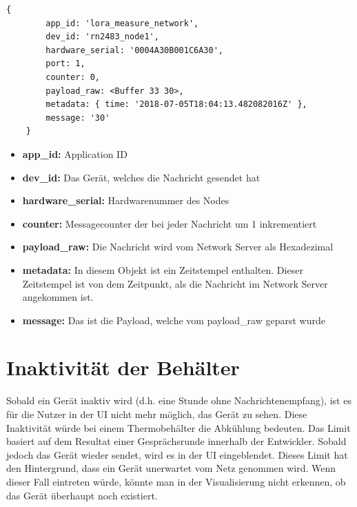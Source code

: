 \begin{lstlisting}[caption=Payload,label=lst:payload]
    { 
        app_id: 'lora_measure_network',
        dev_id: 'rn2483_node1',
        hardware_serial: '0004A30B001C6A30',
        port: 1,
        counter: 0,
        payload_raw: <Buffer 33 30>,
        metadata: { time: '2018-07-05T18:04:13.482082016Z' },
        message: '30' 
    }
\end{lstlisting}
\begin{itemize}
    \item \textbf{app\_id:} Application ID
    \item \textbf{dev\_id:} Das Gerät, welches die Nachricht gesendet hat 
    \item \textbf{hardware\_serial:} Hardwarenummer des Nodes
    \item \textbf{counter:} Messagecounter der bei jeder Nachricht um 1 inkrementiert
    \item \textbf{payload\_raw:} Die Nachricht wird vom Network Server als Hexadezimal
    \item \textbf{metadata:} In diesem Objekt ist ein Zeitstempel enthalten. Dieser Zeitstempel ist von dem Zeitpunkt, als die Nachricht im Network Server angekommen ist.
    \item \textbf{message:} Das ist die Payload, welche vom payload\_raw geparst wurde 
\end{itemize} 
\newpage
\section{Inaktivität der Behälter}
Sobald ein Gerät inaktiv wird (d.h. eine Stunde ohne Nachrichtenempfang), ist es für die Nutzer in der UI nicht mehr möglich, das Gerät zu sehen. Diese Inaktivität würde bei einem Thermobehälter die Abkühlung bedeuten. Das Limit basiert auf dem Resultat einer Gesprächsrunde innerhalb der Entwickler. Sobald jedoch das Gerät wieder sendet, wird es in der UI eingeblendet. Dieses Limit hat den Hintergrund, dass ein Gerät unerwartet vom Netz genommen wird. Wenn dieser Fall eintreten würde, könnte man in der Visualisierung nicht erkennen, ob das Gerät überhaupt noch existiert.

